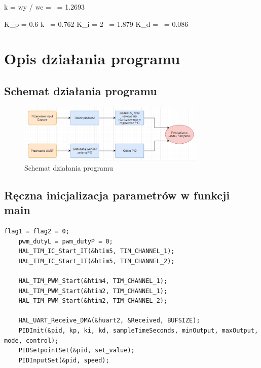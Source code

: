 \documentclass[10pt, a4paper]{article}
\begin{document}
\hspace{-0.55cm} k = \Delta wy / \Delta we =  \ = 1.2693  \newline

\hspace{-0.55cm} K_{p} = 0.6 \ast k \ = 0.762 \newline
K_{i} = 2 \ast {} \ = 1.879 \newline
K_{d} =  \ = 0.086 \newline

\section{Opis działania programu}

\subsection{Schemat działania programu}
	\begin{figure}[H]
		\centering
		\includegraphics[width=0.8\textwidth]{figures/schemat.png}
		\caption{Schemat działania programu}
		\label{fig:diagramPWM}
	\end{figure}

\subsection{Ręczna inicjalizacja parametrów w funkcji main}
	\begin{lstlisting}[tabsize=2]
	flag1 = flag2 = 0;
	pwm_dutyL = pwm_dutyP = 0;
	HAL_TIM_IC_Start_IT(&htim5, TIM_CHANNEL_1);
	HAL_TIM_IC_Start_IT(&htim5, TIM_CHANNEL_2);
	
	HAL_TIM_PWM_Start(&htim4, TIM_CHANNEL_1);
	HAL_TIM_PWM_Start(&htim2, TIM_CHANNEL_1);
	HAL_TIM_PWM_Start(&htim2, TIM_CHANNEL_2);
	
	HAL_UART_Receive_DMA(&huart2, &Received, BUFSIZE);
	PIDInit(&pid, kp, ki, kd, sampleTimeSeconds, minOutput, maxOutput, mode, control);
	PIDSetpointSet(&pid, set_value);
	PIDInputSet(&pid, speed);
	\end{lstlisting}
\end{document}
